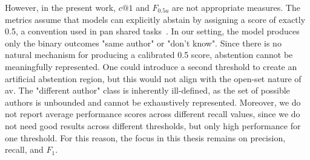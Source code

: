 However, in the present work, $c@1$ and $F_{0.5u}$ are not appropriate measures. 
The metrics assume that models can explicitly abstain by assigning a score of exactly 0.5, a convention used in \ac{pan} shared tasks~\citep{tyo_state_2022,bevendorff_overview_2024,kocher_unine_2015}. 
In our setting, the model produces only the binary outcomes "same author" or "don't know". 
Since there is no natural mechanism for producing a calibrated 0.5 score, abstention cannot be meaningfully represented. 
One could introduce a second threshold to create an artificial abstention region, but this would not align with the open-set nature of \ac{av}. 
The "different author" class is inherently ill-defined, as the set of possible authors is unbounded and cannot be exhaustively represented. 
Moreover, we do not report average performance scores across different recall values, since we do not need good results across different thresholds, but only high performance for one threshold.
For this reason, the focus in this thesis remains on precision, recall, and $F_1$. 
